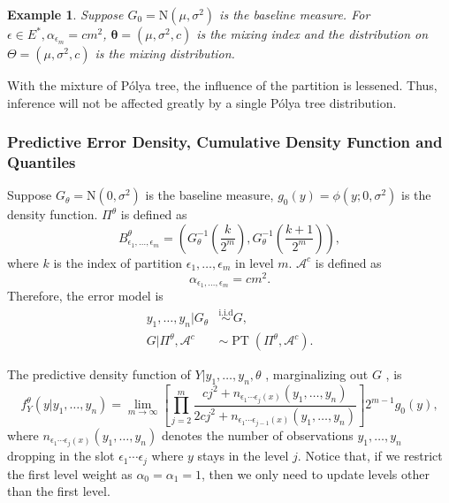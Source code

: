 \documentclass[12pt]{article}
\newtheorem{emp}[thm]{Example}
\newcommand{\polya}{P\'{o}lya}
\newcommand{\iid}{\stackrel{\text{i.i.d}}{\sim}}
\DeclareMathOperator{\pt}{PT}
\begin{document}
\begin{emp}
  Suppose $G_0 = \mathrm{N}(\mu, \sigma^2)$ is the baseline measure.
  For $\epsilon \in E^{*}, \alpha_{\epsilon_m} = cm^2 $, $\bm{\theta}=
  (\mu, \sigma^2, c)$ is the mixing index and the distribution on
  $\Theta = (\mu, \sigma^2, c) $ is the mixing distribution.
\end{emp}
With the mixture of \polya{} tree, the influence of the partition is
lessened. Thus, inference will not be affected greatly by a single
\polya{} tree distribution.

\subsubsection{Predictive Error Density, Cumulative Density Function
  and Quantiles}
Suppose $G_{\theta} = \mathrm{N}(0, \sigma^2)$ is the baseline
measure, $g_0(y) = \phi(y; 0, \sigma^2)$ is the density
function. $\Pi^{\theta}$ is defined as
\begin{displaymath}
  B^{\theta}_{\epsilon_1, \ldots, \epsilon_m} = \left( G^{-1}_{\theta}
    \left( \frac{k}{2^m} \right) , G^{-1}_{\theta}\left( \frac{k+1}{2^m} \right) \right),
\end{displaymath}
where $k$ is the index of partition $\epsilon_1, \ldots, \epsilon_m$
in level $m$. $\mathcal{A}^c$ is defined as
\begin{displaymath}
  \alpha_{\epsilon_1, \ldots, \epsilon_m} = cm^2.
\end{displaymath}
Therefore, the error model is
\begin{align*}
  y_1, \ldots, y_n |G_{\theta} & \iid G, \\
  G|\Pi^{\theta}, \mathcal{A}^{c} & \sim \pt (\Pi^{\theta},
  \mathcal{A}^{c}).
\end{align*}

The predictive density function of $Y|y_1, \ldots, y_n, \theta$ ,
marginalizing out $G$ , is
\begin{equation}
  \label{eq:pred}
  f_Y^{\theta} (y|y_1, \ldots, y_n)  = \lim_{m \to \infty} \left[
    \prod_{j=2}^m \frac{cj^2 + n_{\epsilon_1 \cdots \epsilon_j(x) }(y_1 , \ldots, y_n)}{2cj^2
      + n_{\epsilon_1 \cdots \epsilon_{j-1}(x)}(y_1, \ldots, y_n)}
  \right]2^{m-1} g_0(y),
\end{equation}
where $n_{\epsilon_1 \cdots \epsilon_j(x) }(y_1 , \ldots, y_n)$
denotes the number of observations $y_1, \ldots, y_n$ dropping in the
slot $\epsilon_1 \cdots \epsilon_j$ where $y$ stays in the level
$j$. Notice that, if we restrict the first level weight as
$\alpha_0=\alpha_1=1$, then we only need to update levels other than
the first level.
\end{document}
